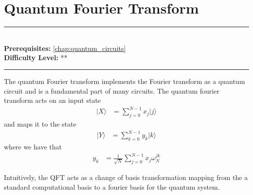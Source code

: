 \documentclass[book.tex]{subfiles}
\begin{document}
\chapter{Quantum Fourier Transform}
\label{chap:quantum_fourier_transform}
\noindent\rule{11cm}{0.4pt} \\
\textbf{Prerequisites:} \autoref{chap:quantum_circuits} \\
\textbf{Difficulty Level:} ** \\
\noindent\rule{11cm}{0.4pt}
\vspace{5mm}

The quantum Fourier transform implements the Fourier transform as a quantum circuit and is a fundamental part of many circuits. The quantum fourier transform acts on an input state
\begin{align}
    |X\rangle &= \sum_{j=0}^{N-1} x_j |j \rangle
\end{align}
and maps it to the state
\begin{align}
|Y\rangle &= \sum_{k=0}^{N-1} y_k |k\rangle
\end{align}
where we have that
\begin{align}
y_k &= \frac{1}{\sqrt{N}} \sum_{j=0}^{N-1} x_j \omega_N^{jk}
\end{align}

Intuitively, the QFT acts as a change of basis transformation mapping from the a standard computational basis to a fourier basis for the quantum system. 
\end{document}
